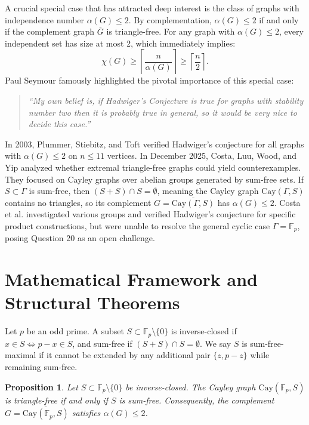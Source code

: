 \documentclass[11pt,a4paper]{article}
\newtheorem{proposition}[theorem]{Proposition}
\theoremstyle{definition}
\begin{document}
A crucial special case that has attracted deep interest is the class of graphs with independence number $\alpha(G) \le 2$. By complementation, $\alpha(G) \le 2$ if and only if the complement graph $\overline{G}$ is triangle-free. For any graph with $\alpha(G) \le 2$, every independent set has size at most 2, which immediately implies:
\[
\chi(G) \ge \left\lceil \frac{n}{\alpha(G)} \right\rceil \ge \left\lceil \frac{n}{2} \right\rceil.
\]
Paul Seymour \cite{seymour2016} famously highlighted the pivotal importance of this special case:
\begin{quote}
\emph{``My own belief is, if Hadwiger’s Conjecture is true for graphs with stability number two then it is probably true in general, so it would be very nice to decide this case.''}
\end{quote}

In 2003, Plummer, Stiebitz, and Toft \cite{plummer2003} verified Hadwiger's conjecture for all graphs with $\alpha(G) \le 2$ on $n \le 11$ vertices.
In December 2025, Costa, Luu, Wood, and Yip \cite{costa2025} analyzed whether extremal triangle-free graphs could yield counterexamples. They focused on Cayley graphs over abelian groups generated by sum-free sets. If $S \subset \Gamma$ is sum-free, then $(S + S) \cap S = \emptyset$, meaning the Cayley graph $\text{Cay}(\Gamma, S)$ contains no triangles, so its complement $G = \overline{\text{Cay}(\Gamma, S)}$ has $\alpha(G) \le 2$. Costa et al. investigated various groups and verified Hadwiger's conjecture for specific product constructions, but were unable to resolve the general cyclic case $\Gamma = \mathbb{F}_p$, posing Question 20 as an open challenge.

\section{Mathematical Framework and Structural Theorems}

Let $p$ be an odd prime. A subset $S \subset \mathbb{F}_p \setminus \{0\}$ is inverse-closed if $x \in S \iff p - x \in S$, and sum-free if $(S + S) \cap S = \emptyset$. We say $S$ is sum-free-maximal if it cannot be extended by any additional pair $\{z, p - z\}$ while remaining sum-free.

\begin{proposition}
Let $S \subset \mathbb{F}_p \setminus \{0\}$ be inverse-closed. The Cayley graph $\text{Cay}(\mathbb{F}_p, S)$ is triangle-free if and only if $S$ is sum-free. Consequently, the complement $G = \overline{\text{Cay}(\mathbb{F}_p, S)}$ satisfies $\alpha(G) \le 2$.
\end{proposition}
\end{document}
